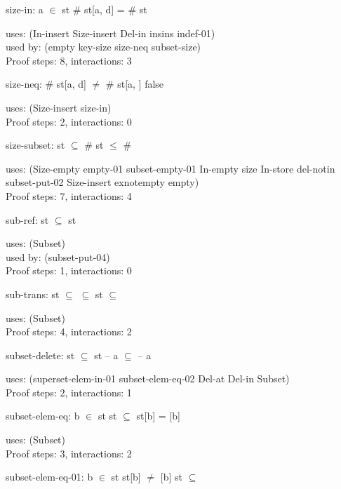 \documentclass[a4paper]{article}
\begin{document}
size-in: 
 \Fol a $\in$ st \Imp \# st[a, d] = \# st


uses: (In-insert Size-insert Del-in insins indef-01)\\
used by: (empty key-size size-neq subset-size)\\
Proof steps: 8, interactions: 3

\medskip

size-neq: 
 \Fol \# st[a, d] $\neq$ \# st[a, ] \Equiv false


uses: (Size-insert size-in)\\
Proof steps: 2, interactions: 0

\medskip

size-subset: 
 \Fol st $\subseteq$  \Imp \# st $\le$ \# 


uses: (Size-empty empty-01 subset-empty-01 In-empty size In-store
       del-notin subset-put-02 Size-insert exnotempty empty)\\
Proof steps: 7, interactions: 4

\medskip

sub-ref: 
 \Fol st $\subseteq$ st


uses: (Subset)\\
used by: (subset-put-04)\\
Proof steps: 1, interactions: 0

\medskip

sub-trans: 
 \Fol st $\subseteq$  \And {} $\subseteq$  \Imp st $\subseteq$ 


uses: (Subset)\\
Proof steps: 4, interactions: 2

\medskip

subset-delete: 
 \Fol st $\subseteq$  \Imp st -- a $\subseteq$  -- a


uses: (superset-elem-in-01 subset-elem-eq-02 Del-at Del-in Subset)\\
Proof steps: 2, interactions: 1

\medskip

subset-elem-eq: 
 \Fol b $\in$ st \And st $\subseteq$  \Imp st[b] = [b]


uses: (Subset)\\
Proof steps: 3, interactions: 2

\medskip

subset-elem-eq-01: 
 \Fol b $\in$ st \And st[b] $\neq$ [b] \Imp \Not st $\subseteq$ 
\end{document}
